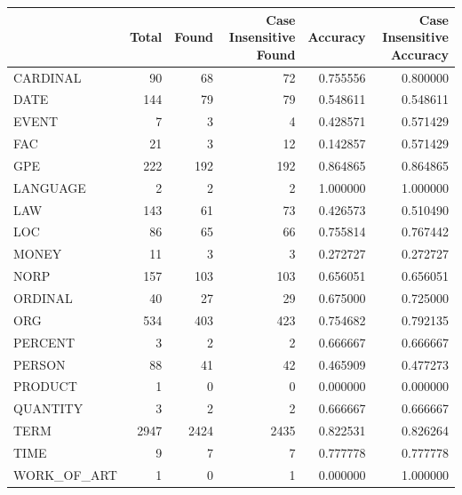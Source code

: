 \begin{tabular}{lrrrrr}
\toprule
 & Total & Found & Case Insensitive Found & Accuracy & Case Insensitive Accuracy \\
\midrule
CARDINAL & 90 & 68 & 72 & 0.755556 & 0.800000 \\
DATE & 144 & 79 & 79 & 0.548611 & 0.548611 \\
EVENT & 7 & 3 & 4 & 0.428571 & 0.571429 \\
FAC & 21 & 3 & 12 & 0.142857 & 0.571429 \\
GPE & 222 & 192 & 192 & 0.864865 & 0.864865 \\
LANGUAGE & 2 & 2 & 2 & 1.000000 & 1.000000 \\
LAW & 143 & 61 & 73 & 0.426573 & 0.510490 \\
LOC & 86 & 65 & 66 & 0.755814 & 0.767442 \\
MONEY & 11 & 3 & 3 & 0.272727 & 0.272727 \\
NORP & 157 & 103 & 103 & 0.656051 & 0.656051 \\
ORDINAL & 40 & 27 & 29 & 0.675000 & 0.725000 \\
ORG & 534 & 403 & 423 & 0.754682 & 0.792135 \\
PERCENT & 3 & 2 & 2 & 0.666667 & 0.666667 \\
PERSON & 88 & 41 & 42 & 0.465909 & 0.477273 \\
PRODUCT & 1 & 0 & 0 & 0.000000 & 0.000000 \\
QUANTITY & 3 & 2 & 2 & 0.666667 & 0.666667 \\
TERM & 2947 & 2424 & 2435 & 0.822531 & 0.826264 \\
TIME & 9 & 7 & 7 & 0.777778 & 0.777778 \\
WORK_OF_ART & 1 & 0 & 1 & 0.000000 & 1.000000 \\
\bottomrule
\end{tabular}
